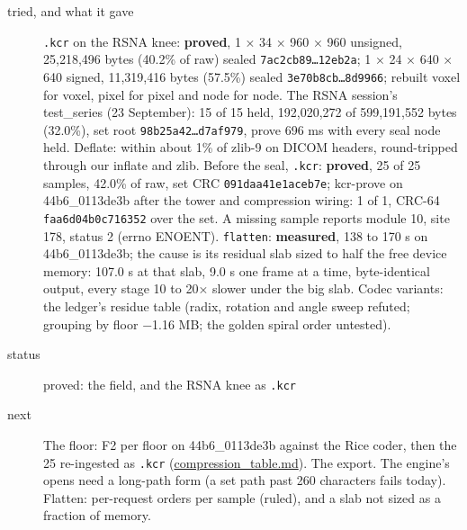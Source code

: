 \begin{description}
\item[{tried, and what it gave}] \texttt{.\allowbreak{}kcr} on the RSNA knee: \textbf{proved}, 1 × 34 × 960 × 960 unsigned, 25,218,496 bytes (40.2\% of raw) sealed \texttt{7ac2cb89…12eb2a}; 1 × 24 × 640 × 640 signed, 11,319,416 bytes (57.5\%) sealed \texttt{3e70b8cb…8d9966}; rebuilt voxel for voxel, pixel for pixel and node for node. The RSNA session's test\_\allowbreak{}series (23 September): 15 of 15 held, 192,020,272 of 599,191,552 bytes (32.0\%), set root \texttt{98b25a42…d7af979}, prove 696 ms with every seal node held. Deflate: within about 1\% of zlib-9 on DICOM headers, round-tripped through our inflate and zlib. Before the seal, \texttt{.\allowbreak{}kcr}: \textbf{proved}, 25 of 25 samples, 42.0\% of raw, set CRC \texttt{091daa41e1aceb7e}; kcr-prove on 44b6\_\allowbreak{}0113de3b after the tower and compression wiring: 1 of 1, CRC-64 \texttt{faa6d04b0c716352} over the set. A missing sample reports module 10, site 178, status 2 (errno ENOENT). \texttt{flatten}: \textbf{measured}, 138 to 170 s on 44b6\_\allowbreak{}0113de3b; the cause is its residual slab sized to half the free device memory: 107.0 s at that slab, 9.0 s one frame at a time, byte-identical output, every stage 10 to 20× slower under the big slab. Codec variants: the ledger's residue table (radix, rotation and angle sweep refuted; grouping by floor −1.16 MB; the golden spiral order untested).
\item[{status}] proved: the field, and the RSNA knee as \texttt{.\allowbreak{}kcr}
\item[{next}] The floor: F2 per floor on 44b6\_\allowbreak{}0113de3b against the Rice coder, then the 25 re-ingested as \texttt{.\allowbreak{}kcr} (\hyperref[chap:compression-table]{compression\_\allowbreak{}table.md}). The export. The engine's opens need a long-path form (a set path past 260 characters fails today). Flatten: per-request orders per sample (ruled), and a slab not sized as a fraction of memory.
\end{description}

